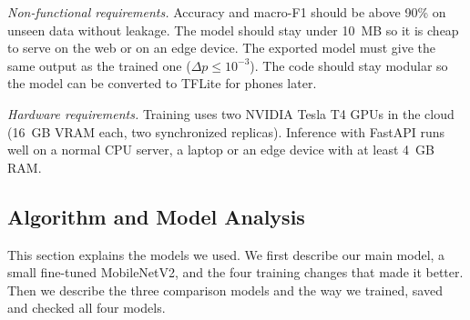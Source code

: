 \textit{Non-functional requirements.} Accuracy and macro-F1 should be above 90\% on unseen data without leakage. The model should stay under 10~MB so it is cheap to serve on the web or on an edge device. The exported model must give the same output as the trained one ($\Delta p \le 10^{-3}$). The code should stay modular so the model can be converted to TFLite for phones later.

\textit{Hardware requirements.} Training uses two NVIDIA Tesla T4 GPUs in the cloud (16~GB VRAM each, two synchronized replicas). Inference with FastAPI runs well on a normal CPU server, a laptop or an edge device with at least 4~GB RAM.

\subsection{Algorithm and Model Analysis}
This section explains the models we used. We first describe our main model, a small fine-tuned MobileNetV2, and the four training changes that made it better. Then we describe the three comparison models and the way we trained, saved and checked all four models.

